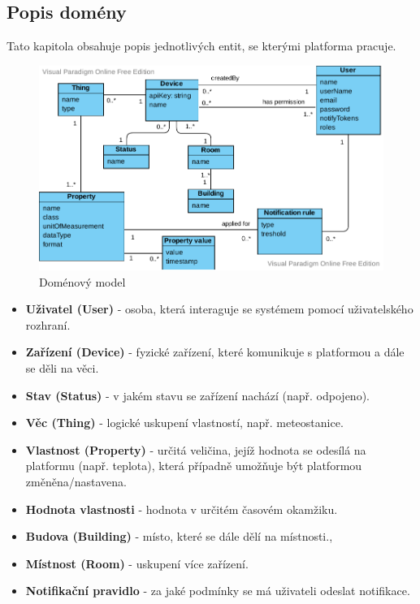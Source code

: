 \subsection{Popis domény}
Tato kapitola obsahuje popis jednotlivých entit, se kterými platforma pracuje.
\begin{figure}[htbp]
    \centering
    \includegraphics[width=\textwidth]{img/domain.pdf}
    \caption{  \label{domain-model}Doménový model}
\end{figure}
\begin{itemize}
    \item \textbf{Uživatel (User)} - osoba, která interaguje se systémem pomocí uživatelského rozhraní.
    \item \textbf{Zařízení (Device)} - fyzické zařízení, které komunikuje s platformou a dále se děli na věci.
    \item \textbf{Stav (Status)} - v jakém stavu se zařízení nachází (např. odpojeno).
    \item \textbf{Věc (Thing)} - logické uskupení vlastností, např. meteostanice.
    \item \textbf{Vlastnost (Property)} - určitá veličina, jejíž hodnota se odesílá na platformu (např. teplota), která případně umožňuje být platformou změněna/nastavena.
    \item \textbf{Hodnota vlastnosti} - hodnota v určitém časovém okamžiku.
    \item \textbf{Budova (Building)} - místo, které se dále dělí na místnosti.,
    \item \textbf{Místnost (Room)} - uskupení více zařízení.
    \item \textbf{Notifikační pravidlo} - za jaké podmínky se má uživateli odeslat notifikace.
\end{itemize}


